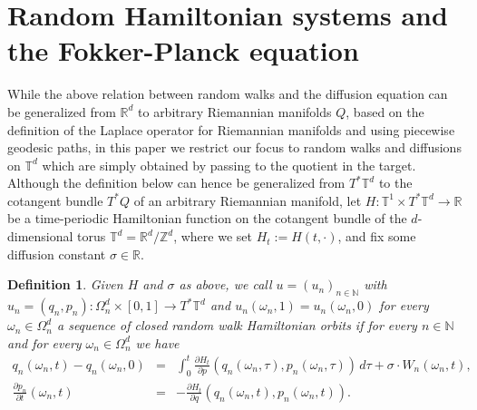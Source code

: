 \documentclass[a4paper,11pt]{amsart}
\newcommand{\NN}{\mathbb{N}}
\newcommand{\ZZ}{\mathbb{Z}}
\newcommand{\RR}{\mathbb{R}}
\newcommand{\TT}{\mathbb{T}}
\newtheorem{definition}[theorem]{Definition}
\begin{document}
\section{Random Hamiltonian systems and the Fokker-Planck equation}
While the above relation between random walks and the diffusion equation can be generalized from $\RR^d$ to arbitrary Riemannian manifolds $Q$, based on the definition of the Laplace operator for Riemannian manifolds and using piecewise geodesic paths, in this paper we restrict our focus to random walks and diffusions on $\TT^d$ which are simply obtained by passing to the quotient in the target. Although the definition below can hence be generalized from $T^*\TT^d$ to the cotangent bundle $T^*Q$ of an arbitrary Riemannian manifold, let  
$H:\TT^1\times T^*\TT^d\to\RR$ be a time-periodic Hamiltonian function on the cotangent bundle of the $d$-dimensional torus $\TT^d=\RR^d/\ZZ^d$, where we set $H_t:=H(t,\cdot)$, and fix some diffusion constant $\sigma\in\RR$. 
\begin{definition}\label{stoch_sol}
Given $H$ and $\sigma$ as above, we call $u=(u_n)_{n\in\NN}$ with $u_n=(q_n,p_n):\Omega_n^d\times [0,1]\to T^*\TT^d$ and $u_n(\omega_n,1)=u_n(\omega_n,0)$ for every $\omega_n\in\Omega_n^d$ a \emph{sequence of closed random walk Hamiltonian orbits} if for every $n\in\NN$ and for every $\omega_n\in\Omega_n^d$ we have 
\begin{eqnarray*}
 q_n(\omega_n,t)-q_n(\omega_n,0)&=&\int_0^t \frac{\partial H_t}{\partial p}(q_n(\omega_n,\tau),p_n(\omega_n,\tau))\,d\tau + \sigma\cdot W_n(\omega_n,t),\\ \frac{\partial p_n}{\partial t}(\omega_n,t)&=&-\frac{\partial H_t}{\partial q}(q_n(\omega_n,t),p_n(\omega_n,t)).
 \end{eqnarray*}
\end{definition}
\end{document}
